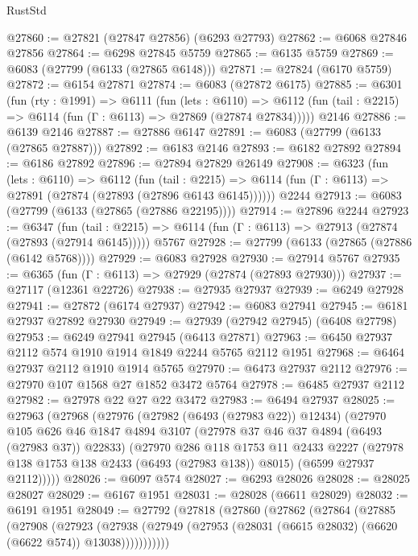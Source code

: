 \begin{lexlean}{RustStd}
\begin{coremodule}
@27860 := @27821 (@27847 @27856) (@6293 @27793)
@27862 := @6068 @27846 @27856
@27864 := @6298 @27845 @5759
@27865 := @6135 @5759
@27869 := @6083 (@27799 (@6133 (@27865 @6148)))
@27871 := @27824 (@6170 @5759)
@27872 := @6154 @27871
@27874 := @6083 (@27872 @6175)
@27885 := @6301
    (fun (rty : @1991) =>
    @6111
      (fun (lets : @6110) =>
      @6112 (fun (tail : @2215) => @6114 (fun (Γ : @6113) => @27869 (@27874 @27834)))))
    @2146
@27886 := @6139 @2146
@27887 := @27886 @6147
@27891 := @6083 (@27799 (@6133 (@27865 @27887)))
@27892 := @6183 @2146
@27893 := @6182 @27892
@27894 := @6186 @27892
@27896 := @27894 @27829 @26149
@27908 := @6323
    (fun (lets : @6110) =>
    @6112
      (fun (tail : @2215) =>
      @6114 (fun (Γ : @6113) => @27891 (@27874 (@27893 (@27896 @6143 @6145))))))
    @2244
@27913 := @6083 (@27799 (@6133 (@27865 (@27886 @22195))))
@27914 := @27896 @2244
@27923 := @6347
    (fun (tail : @2215) => @6114 (fun (Γ : @6113) => @27913 (@27874 (@27893 (@27914 @6145)))))
    @5767
@27928 := @27799 (@6133 (@27865 (@27886 (@6142 @5768))))
@27929 := @6083 @27928
@27930 := @27914 @5767
@27935 := @6365 (fun (Γ : @6113) => @27929 (@27874 (@27893 @27930)))
@27937 := @27117 (@12361 @22726)
@27938 := @27935 @27937
@27939 := @6249 @27928
@27941 := @27872 (@6174 @27937)
@27942 := @6083 @27941
@27945 := @6181 @27937 @27892 @27930
@27949 := @27939 (@27942 @27945) (@6408 @27798)
@27953 := @6249 @27941 @27945 (@6413 @27871)
@27963 := @6450 @27937 @2112 @574 @1910 @1914 @1849 @2244 @5765 @2112 @1951
@27968 := @6464 @27937 @2112 @1910 @1914 @5765
@27970 := @6473 @27937 @2112
@27976 := @27970 @107 @1568 @27 @1852 @3472 @5764
@27978 := @6485 @27937 @2112
@27982 := @27978 @22 @27 @22 @3472
@27983 := @6494 @27937
@28025 := @27963
    (@27968
      (@27976
        (@27982 (@6493 (@27983 @22)) @12434)
        (@27970
          @105
          @626
          @46
          @1847
          @4894
          @3107
          (@27978 @37 @46 @37 @4894 (@6493 (@27983 @37)) @22833)
          (@27970
            @286
            @118
            @1753
            @11
            @2433
            @2227
            (@27978 @138 @1753 @138 @2433 (@6493 (@27983 @138)) @8015)
            (@6599 @27937 @2112)))))
@28026 := @6097 @574
@28027 := @6293 @28026
@28028 := @28025 @28027
@28029 := @6167 @1951
@28031 := @28028 (@6611 @28029)
@28032 := @6191 @1951
@28049 := @27792
    (@27818
      (@27860
        (@27862
          (@27864
            (@27885
              (@27908
                (@27923
                  (@27938
                    (@27949 (@27953 (@28031 (@6615 @28032) (@6620 (@6622 @574)) @13038)))))))))))

\end{coremodule}
\end{lexlean}
